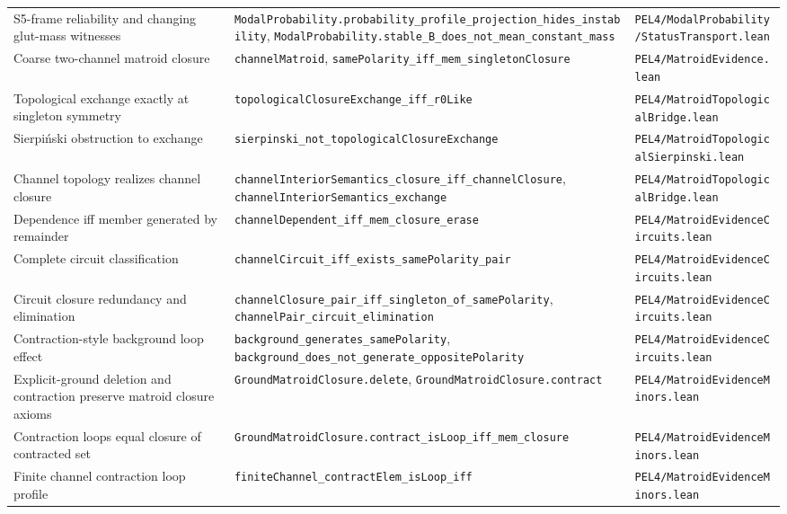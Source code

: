 \begin{longtable}{@{}p{}p{}p{}@{}}
\addlinespace
S5-frame reliability and changing glut-mass witnesses & \texttt{ModalProbability.probability\_profile\_projection\_hides\_instability}, \texttt{ModalProbability.stable\_B\_does\_not\_mean\_constant\_mass} & \texttt{PEL4/ModalProbability/StatusTransport.lean}\\
\addlinespace
Coarse two-channel matroid closure & \texttt{channelMatroid}, \texttt{samePolarity\_iff\_mem\_singletonClosure} & \texttt{PEL4/MatroidEvidence.lean}\\
\addlinespace
Topological exchange exactly at singleton symmetry & \texttt{topologicalClosureExchange\_iff\_r0Like} & \texttt{PEL4/MatroidTopologicalBridge.lean}\\
\addlinespace
Sierpiński obstruction to exchange & \texttt{sierpinski\_not\_topologicalClosureExchange} & \texttt{PEL4/MatroidTopologicalSierpinski.lean}\\
\addlinespace
Channel topology realizes channel closure & \texttt{channelInteriorSemantics\_closure\_iff\_channelClosure}, \texttt{channelInteriorSemantics\_exchange} & \texttt{PEL4/MatroidTopologicalBridge.lean}\\
\addlinespace
Dependence iff member generated by remainder & \texttt{channelDependent\_iff\_mem\_closure\_erase} & \texttt{PEL4/MatroidEvidenceCircuits.lean}\\
\addlinespace
Complete circuit classification & \texttt{channelCircuit\_iff\_exists\_samePolarity\_pair} & \texttt{PEL4/MatroidEvidenceCircuits.lean}\\
\addlinespace
Circuit closure redundancy and elimination & \texttt{channelClosure\_pair\_iff\_singleton\_of\_samePolarity}, \texttt{channelPair\_circuit\_elimination} & \texttt{PEL4/MatroidEvidenceCircuits.lean}\\
\addlinespace
Contraction-style background loop effect & \texttt{background\_generates\_samePolarity}, \texttt{background\_does\_not\_generate\_oppositePolarity} & \texttt{PEL4/MatroidEvidenceCircuits.lean}\\
\addlinespace
Explicit-ground deletion and contraction preserve matroid closure axioms & \texttt{GroundMatroidClosure.delete}, \texttt{GroundMatroidClosure.contract} & \texttt{PEL4/MatroidEvidenceMinors.lean}\\
\addlinespace
Contraction loops equal closure of contracted set & \texttt{GroundMatroidClosure.contract\_isLoop\_iff\_mem\_closure} & \texttt{PEL4/MatroidEvidenceMinors.lean}\\
\addlinespace
Finite channel contraction loop profile & \texttt{finiteChannel\_contractElem\_isLoop\_iff} & \texttt{PEL4/MatroidEvidenceMinors.lean}\\

\end{longtable}
